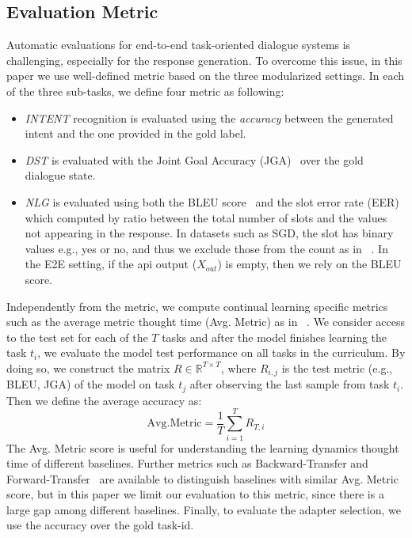 \documentclass[11pt,a4paper]{article}
\begin{document}
\begin{table}[t]
\caption{E2E results in term of Intent accuracy, Joint-Goal-Accuracy (JGA), Slot-Error-Rate (EER) and BLUE. +Param shows the additional number of parameters per task, and Mem the episodic memory size need per task. }
\label{tab:e2e}
\end{table}


\subsection{Evaluation Metric}
Automatic evaluations for end-to-end task-oriented dialogue systems is challenging, especially for the response generation. To overcome this issue, in this paper we use well-defined metric based on the three modularized settings. In each of the three sub-tasks, we define four metric as following:
\begin{itemize}[noitemsep]
    \item \textit{INTENT} recognition is evaluated using the \textit{accuracy} between the generated intent and the one provided in the gold label. 
    \item \textit{DST} is evaluated with the Joint Goal Accuracy (JGA)~\cite{wu2019transferable} over the gold dialogue state.
    \item \textit{NLG} is evaluated using both the BLEU score~\cite{papineni-etal-2002-bleu} and the slot error rate (EER)~\cite{wen2015semantically} which computed by ratio between the total number of slots and the values not appearing in the response. In datasets such as SGD, the slot has binary values e.g., yes or no, and thus we exclude those from the count as in ~\citet{kale2020few}. In the E2E setting, if the api output ($X_{out}$) is empty, then we rely on the BLEU score.  
\end{itemize}
Independently from the metric, we compute continual learning specific metrics such as the average metric thought time (Avg. Metric) as in ~\citet{lopez2017gradient}. We consider access to the test set for each of the $T$ tasks and after the model finishes learning the task $t_i$, we evaluate the model test performance on all tasks in the curriculum. By doing so, we construct the matrix $R\in \mathbb{R}^{T\times T}$, where $R_{i,j}$ is the test metric (e.g., BLEU, JGA) of the model on task $t_j$ after observing the last sample from task $t_i$. Then we define the average accuracy as:
\begin{equation}
    \mathrm{Avg. Metric} =\frac{1}{T} \sum_{i=1}^{T} R_{T, i} \label{eq:avgmetric}
\end{equation}
The Avg. Metric score is useful for understanding the learning dynamics thought time of different baselines. Further metrics such as Backward-Transfer and Forward-Transfer~\cite{lopez2017gradient} are available to distinguish baselines with similar Avg. Metric score, but in this paper we limit our evaluation to this metric, since there is a large gap among different baselines. Finally, to evaluate the adapter selection, we use the accuracy over the gold task-id. 
\end{document}
